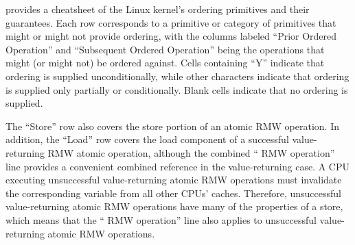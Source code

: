 \begin{table}
\vspace{5pt}\hfill
{}
\caption{Linux-Kernel Memory-Ordering Cheat Sheet}
\label{tab:memorder:Linux-Kernel Memory-Ordering Cheat Sheet}
\end{table}

provides a cheatsheet of the Linux kernel's ordering primitives and their
guarantees.
Each row corresponds to a primitive or category of primitives that might
or might not provide ordering, with the columns labeled
``Prior Ordered Operation'' and ``Subsequent Ordered Operation''
being the operations that might (or might not) be ordered against.
Cells containing ``Y'' indicate that ordering is supplied unconditionally,
while other characters indicate that ordering is supplied only partially or
conditionally.
Blank cells indicate that no ordering is supplied.

The ``Store'' row also covers the store portion of an atomic RMW operation.
In addition, the ``Load'' row covers the load
component of a successful value-returning  RMW atomic
operation, although the combined `` RMW operation''
line provides a convenient combined reference in the value-returning case.
A CPU executing unsuccessful value-returning atomic RMW operations must
invalidate the corresponding variable from all other CPUs' caches.
Therefore, unsuccessful value-returning atomic RMW operations have many
of the properties of a store, which means that the ``
RMW operation'' line also applies to unsuccessful value-returning atomic
RMW operations.

